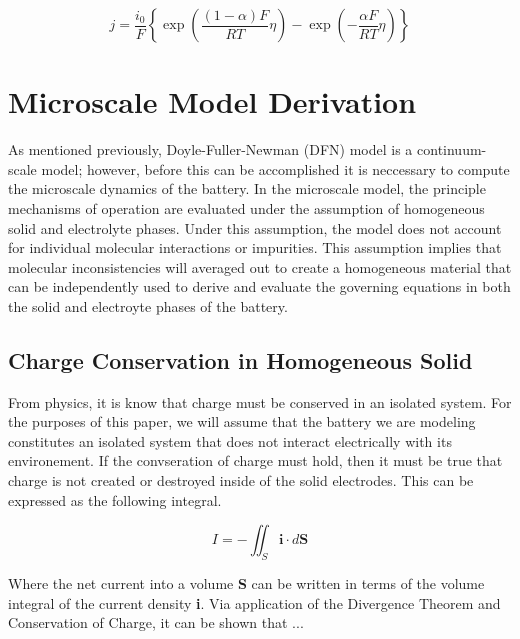 \documentclass[lettersize,journal]{IEEEtran}
\begin{document}
\begin{equation} \label{lithium_movment}
j=\frac{i_{0}}{F}\left\{\exp \left(\frac{(1-\alpha) F}{R T} \eta\right)-\exp \left(-\frac{\alpha F}{R T} \eta\right)\right\}
\end{equation}

\section{Microscale Model Derivation}

As mentioned previously, Doyle-Fuller-Newman (DFN) model is a continuum-scale model; however, before this can be accomplished it is neccessary to compute the microscale dynamics of the battery. In the microscale model, the principle mechanisms of operation are evaluated under the assumption of homogeneous solid and electrolyte phases. Under this assumption, the model does not account for individual molecular interactions or impurities. This assumption implies that molecular inconsistencies will averaged out to create a homogeneous material that can be independently used to derive and evaluate the governing equations in both the solid and electroyte phases of the battery.


\subsection{Charge Conservation in Homogeneous Solid}

From physics, it is know that charge must be conserved in an isolated system. For the purposes of this paper, we will assume that the battery we are modeling constitutes an isolated system that does not interact electrically with its environement. If the convseration of charge must hold, then it must be true that charge is not created or destroyed inside of the solid electrodes. This can be expressed as the following integral.

\begin{equation}
 I = - \iint_S \textbf{i} \cdot d \textbf{S}
\end{equation}

Where the net current into a volume \textbf{S} can be written in terms of the volume integral of the current density \textbf{i}. Via application of the Divergence Theorem and Conservation of Charge, it can be shown that ...
\end{document}
